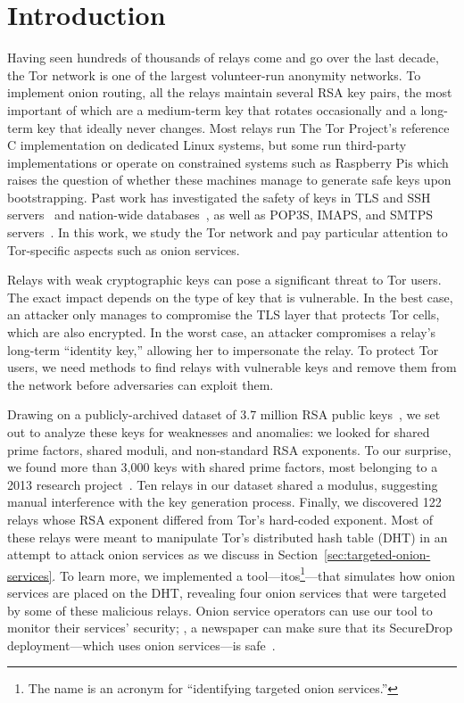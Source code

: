 \section{Introduction}
Having seen hundreds of thousands of relays come and go over the last decade,
the Tor network is one of the largest volunteer-run anonymity networks.  To
implement onion routing, all the relays maintain several RSA key pairs, 
the most important of which are a medium-term key that rotates occasionally 
and a long-term key that ideally never changes.  
Most relays run The Tor Project's reference C
implementation on dedicated Linux systems, but some run third-party
implementations or operate on constrained systems such as Raspberry Pis which
raises the question of whether these machines manage to generate safe keys
upon bootstrapping.  Past work has investigated the safety of keys in TLS and
SSH servers~\cite{Heninger2012a} and  nation-wide
databases~\cite{Bernstein2013a}, as well as POP3S, IMAPS, and SMTPS
servers~\cite{Hastings2016a}.  In this work, we study the Tor network and pay
particular attention to Tor-specific aspects such as onion services.

Relays with weak cryptographic keys can pose a significant threat to Tor users.
The exact impact depends on the type of key that is vulnerable.  In the best
case, an attacker only manages to compromise the TLS layer that protects Tor
cells, which are also encrypted.  In the worst case, an attacker compromises a
relay's long-term ``identity key,'' allowing her to impersonate the relay.
To protect Tor users, we need methods to find relays with vulnerable keys and
remove them from the network before adversaries can exploit them.

Drawing on a publicly-archived dataset of 3.7 million RSA public
keys~\cite{collector}, we set out to analyze these keys for weaknesses and
anomalies: we looked for shared prime factors, shared moduli, 
and non-standard RSA exponents.
To our surprise, we found more than 3,000 keys with shared prime factors, most
belonging to a 2013 research project~\cite{Biryukov2013a}.  Ten relays in
our dataset shared a modulus, suggesting manual interference with the key
generation process.  Finally, we discovered 122 relays whose RSA exponent
differed from Tor's hard-coded exponent.  Most of these relays were meant to
manipulate Tor's distributed hash table (DHT) in an attempt to attack onion
services as we discuss in Section~\ref{sec:targeted-onion-services}.  To learn
more, we implemented a tool---itos\footnote{The name is an acronym for
``identifying targeted onion services.''}---that simulates how onion services
are placed on the DHT, revealing four onion services that were targeted by some
of these malicious relays.  Onion service operators can use our tool to monitor
their services' security; \eg, a newspaper can make sure that its SecureDrop
deployment---which uses onion services---is safe~\cite{securedrop}.

